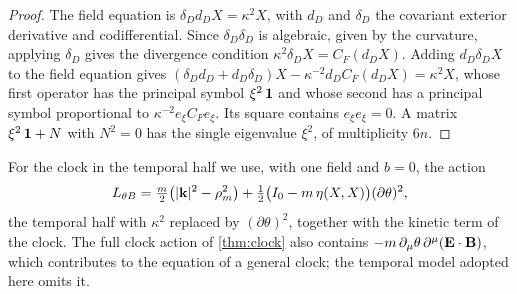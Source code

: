\begin{proof}
The field equation is $\delta_Dd_DX=\kappa^2X$, with $d_D$ and $\delta_D$ the covariant exterior derivative and codifferential. Since
$\delta_D\delta_D$ is algebraic, given by the curvature, applying $\delta_D$ gives the divergence condition $\kappa^2\delta_DX=C_F(d_DX)$.
Adding $d_D\delta_DX$ to the field equation gives $(\delta_Dd_D+d_D\delta_D)X-\kappa^{-2}d_DC_F(d_DX)=\kappa^2X$, whose first operator has
the principal symbol $\xi^2\,\mathbf 1$ and whose second has a principal symbol proportional to $\kappa^{-2}e_\xi C_Fe_\xi$. Its square contains
$e_\xi e_\xi=0$. A matrix $\xi^2\,\mathbf 1+N$ with $N^2=0$ has the single eigenvalue $\xi^2$, of multiplicity $6n$.
\end{proof}

For the clock in the temporal half we use, with one field and $b=0$, the action
\begin{equation}
\label{eq:LthetaB}
L_{\theta B}=\tfrac m2\bigl(|\mathbf k|^2-\rho_m^2\bigr)+\tfrac12\bigl(I_0-m\,\eta(X,X)\bigr)(\partial\theta)^2 ,
\end{equation}
the temporal half with $\kappa^2$ replaced by $(\partial\theta)^2$, together with the kinetic term of the clock. The full clock action of
\cref{thm:clock} also contains $-m\,\partial_\mu\theta\,\partial^\mu(\mathbf E\cdot\mathbf B)$, which contributes to the equation of a general clock; the
temporal model adopted here omits it.

